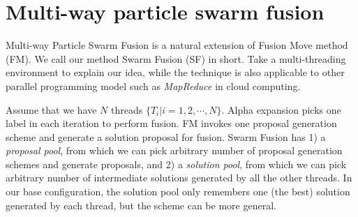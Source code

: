 \section{Multi-way particle swarm fusion}
Multi-way Particle Swarm Fusion is a natural extension of Fusion Move
method (FM). We call our method Swarm Fusion (SF) in short. Take a
multi-threading environment to explain our idea, while the technique is
also applicable to other parallel programming model such as {\it
MapReduce} in cloud computing.
%

Assume that we have $N$ threads $\{T_i | i=1, 2, \cdots, N\}$.  Alpha
expansion picks one label in each iteration to perform fusion. FM
invokes one proposal generation scheme and generate a solution proposal
for fusion. Swarm Fusion has 1) a {\it proposal pool}, from which we can pick
arbitrary number of proposal generation schemes and generate proposals,
and 2) a {\it solution pool}, from which we can pick arbitrary number of
intermediate solutions generated by all the other threads.
%
%
In our base configuration, the solution pool only remembers one (the
best) solution generated by each thread, but the scheme can be more
general.

